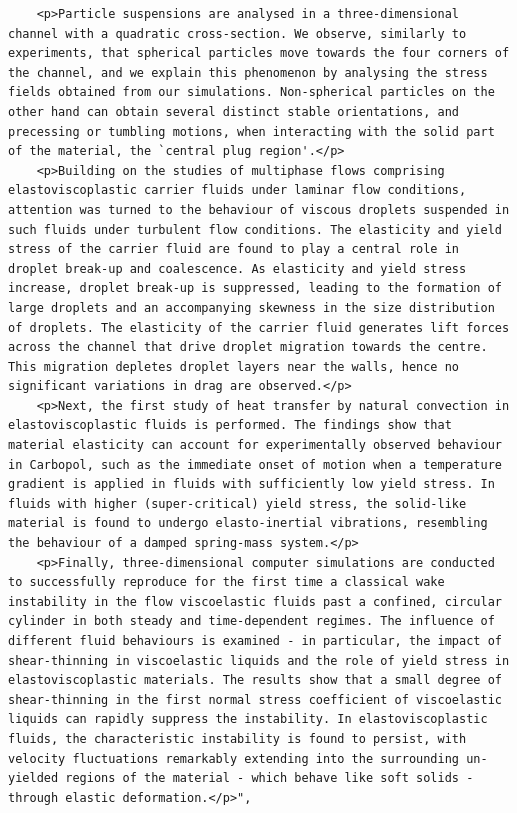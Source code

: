 \begin{casestudySection}
\begin{lstlisting}
    <p>Particle suspensions are analysed in a three-dimensional channel with a quadratic cross-section. We observe, similarly to experiments, that spherical particles move towards the four corners of the channel, and we explain this phenomenon by analysing the stress fields obtained from our simulations. Non-spherical particles on the other hand can obtain several distinct stable orientations, and precessing or tumbling motions, when interacting with the solid part of the material, the `central plug region'.</p>
    <p>Building on the studies of multiphase flows comprising elastoviscoplastic carrier fluids under laminar flow conditions, attention was turned to the behaviour of viscous droplets suspended in such fluids under turbulent flow conditions. The elasticity and yield stress of the carrier fluid are found to play a central role in droplet break-up and coalescence. As elasticity and yield stress increase, droplet break-up is suppressed, leading to the formation of large droplets and an accompanying skewness in the size distribution of droplets. The elasticity of the carrier fluid generates lift forces across the channel that drive droplet migration towards the centre. This migration depletes droplet layers near the walls, hence no significant variations in drag are observed.</p>
    <p>Next, the first study of heat transfer by natural convection in elastoviscoplastic fluids is performed. The findings show that material elasticity can account for experimentally observed behaviour in Carbopol, such as the immediate onset of motion when a temperature gradient is applied in fluids with sufficiently low yield stress. In fluids with higher (super-critical) yield stress, the solid-like material is found to undergo elasto-inertial vibrations, resembling the behaviour of a damped spring-mass system.</p>
    <p>Finally, three-dimensional computer simulations are conducted to successfully reproduce for the first time a classical wake instability in the flow viscoelastic fluids past a confined, circular cylinder in both steady and time-dependent regimes. The influence of different fluid behaviours is examined - in particular, the impact of shear-thinning in viscoelastic liquids and the role of yield stress in elastoviscoplastic materials. The results show that a small degree of shear-thinning in the first normal stress coefficient of viscoelastic liquids can rapidly suppress the instability. In elastoviscoplastic fluids, the characteristic instability is found to persist, with velocity fluctuations remarkably extending into the surrounding un-yielded regions of the material - which behave like soft solids - through elastic deformation.</p>",

\end{lstlisting}
\end{casestudySection}
